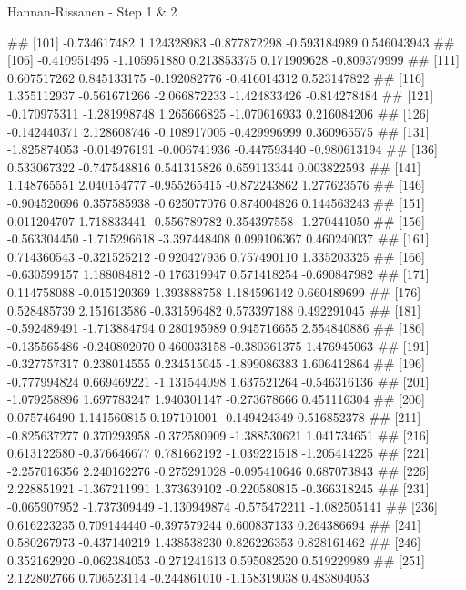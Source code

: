 \documentclass[11pt,ignorenonframetext,]{beamer}
\newenvironment{Shaded}{}{}
\newcommand{\NormalTok}[1]{#1}
\let\oldShaded\Shaded
\let\endoldShaded\endShaded
\renewenvironment{Shaded}{\footnotesize\begin{spacing}{0.9}\oldShaded}{\endoldShaded\end{spacing}}
\begin{document}
\begin{frame}[fragile,t]{Hannan-Rissanen - Step 1 \& 2}
\begin{Shaded}
\begin{Highlighting}[]
\NormalTok{## [101] -0.734617482  1.124328983 -0.877872298 -0.593184989  0.546043943}
\NormalTok{## [106] -0.410951495 -1.105951880  0.213853375  0.171909628 -0.809379999}
\NormalTok{## [111]  0.607517262  0.845133175 -0.192082776 -0.416014312  0.523147822}
\NormalTok{## [116]  1.355112937 -0.561671266 -2.066872233 -1.424833426 -0.814278484}
\NormalTok{## [121] -0.170975311 -1.281998748  1.265666825 -1.070616933  0.216084206}
\NormalTok{## [126] -0.142440371  2.128608746 -0.108917005 -0.429996999  0.360965575}
\NormalTok{## [131] -1.825874053 -0.014976191 -0.006741936 -0.447593440 -0.980613194}
\NormalTok{## [136]  0.533067322 -0.747548816  0.541315826  0.659113344  0.003822593}
\NormalTok{## [141]  1.148765551  2.040154777 -0.955265415 -0.872243862  1.277623576}
\NormalTok{## [146] -0.904520696  0.357585938 -0.625077076  0.874004826  0.144563243}
\NormalTok{## [151]  0.011204707  1.718833441 -0.556789782  0.354397558 -1.270441050}
\NormalTok{## [156] -0.563304450 -1.715296618 -3.397448408  0.099106367  0.460240037}
\NormalTok{## [161]  0.714360543 -0.321525212 -0.920427936  0.757490110  1.335203325}
\NormalTok{## [166] -0.630599157  1.188084812 -0.176319947  0.571418254 -0.690847982}
\NormalTok{## [171]  0.114758088 -0.015120369  1.393888758  1.184596142  0.660489699}
\NormalTok{## [176]  0.528485739  2.151613586 -0.331596482  0.573397188  0.492291045}
\NormalTok{## [181] -0.592489491 -1.713884794  0.280195989  0.945716655  2.554840886}
\NormalTok{## [186] -0.135565486 -0.240802070  0.460033158 -0.380361375  1.476945063}
\NormalTok{## [191] -0.327757317  0.238014555  0.234515045 -1.899086383  1.606412864}
\NormalTok{## [196] -0.777994824  0.669469221 -1.131544098  1.637521264 -0.546316136}
\NormalTok{## [201] -1.079258896  1.697783247  1.940301147 -0.273678666  0.451116304}
\NormalTok{## [206]  0.075746490  1.141560815  0.197101001 -0.149424349  0.516852378}
\NormalTok{## [211] -0.825637277  0.370293958 -0.372580909 -1.388530621  1.041734651}
\NormalTok{## [216]  0.613122580 -0.376646677  0.781662192 -1.039221518 -1.205414225}
\NormalTok{## [221] -2.257016356  2.240162276 -0.275291028 -0.095410646  0.687073843}
\NormalTok{## [226]  2.228851921 -1.367211991  1.373639102 -0.220580815 -0.366318245}
\NormalTok{## [231] -0.065907952 -1.737309449 -1.130949874 -0.575472211 -1.082505141}
\NormalTok{## [236]  0.616223235  0.709144440 -0.397579244  0.600837133  0.264386694}
\NormalTok{## [241]  0.580267973 -0.437140219  1.438538230  0.826226353  0.828161462}
\NormalTok{## [246]  0.352162920 -0.062384053 -0.271241613  0.595082520  0.519229989}
\NormalTok{## [251]  2.122802766  0.706523114 -0.244861010 -1.158319038  0.483804053}

\end{Highlighting}
\end{Shaded}
\end{frame}
\end{document}
